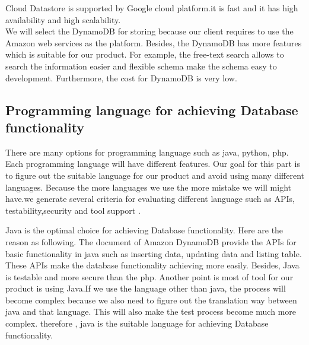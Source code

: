 \documentclass[10pt,draftclsnofoot,onecolumn,journal,compsoc]{IEEEtran}
\begin{document}
        \noindent Cloud Datastore is supported by Google cloud platform.it is fast and it has high availability and high scalability.\\

        \noindent We will select the DynamoDB for storing because our client requires to use the Amazon web services as the platform. Besides, the DynamoDB has more features which is suitable for our product. For example, the free-text search allows to search the information easier and flexible schema make the schema easy to development. Furthermore, the cost for DynamoDB is very low.
        
        \subsection{Programming language for achieving Database functionality}
        There are many options for programming language such as java, python, php. Each programming language will have different features. Our goal for this part is to figure out the suitable language for our product and avoid using many different languages. Because the more languages we use the more mistake we will might have.we generate several criteria for evaluating different language such as APIs, testability,security and tool support .

        \begin{table}[ht]
        \end{table}
                
        \noindent Java is the optimal choice for achieving Database functionality. Here are the reason as following. The document of Amazon DynamoDB provide the APIs for basic functionality in java such as inserting data, updating data and listing table. These APIs make the database functionality achieving more easily. Besides, Java is testable and more secure than the php. Another point is most of tool for our product is using Java.If we use the language other than java, the process will become complex because we also need to figure out the translation way  between java and that language. This will also make the test process become much more complex. therefore , java is the suitable language for achieving Database functionality.
\end{document}

